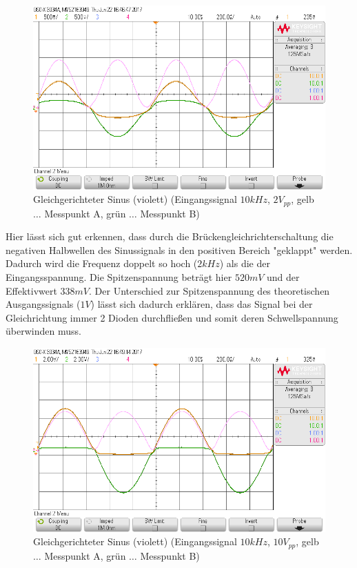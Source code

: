 \documentclass[12pt,a4paper,titlepage]{article}
\begin{document}
\begin{figure}[H]
  \centering
  \includegraphics[width=150mm]{scope_52.png}
  \caption{Gleichgerichteter Sinus (violett) (Eingangssignal $10kHz$, $2V_{pp}$, gelb $\hdots$ Messpunkt A, grün $\hdots$ Messpunkt B)}
\end{figure}

\noindent Hier lässt sich gut erkennen, dass durch die Brückengleichrichterschaltung die negativen Halbwellen des Sinussignals in den positiven Bereich "geklappt" werden. Dadurch wird die Frequenz doppelt so hoch ($2kHz$) als die der Eingangsspannung. Die Spitzenspannung beträgt hier $520mV$ und der Effektivwert $338mV$. Der Unterschied zur Spitzenspannung des theoretischen Ausgangssignals ($1V$) lässt sich dadurch erklären, dass das Signal bei der Gleichrichtung immer 2 Dioden durchfließen und somit deren Schwellspannung überwinden muss.

\begin{figure}[H]
  \centering
  \includegraphics[width=150mm]{scope_54.png}
  \caption{Gleichgerichteter Sinus (violett) (Eingangssignal $10kHz$, $10V_{pp}$, gelb $\hdots$ Messpunkt A, grün $\hdots$ Messpunkt B)}
\end{figure}
\end{document}
